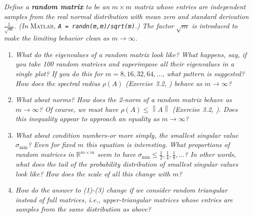 \documentclass[a4paper,oneside]{book}
\numberwithin{equation}{chapter}
\begin{document}
\textit{Define a \textbf{random matrix} to be an $m\times m$ matrix whose entries are independent samples from the real normal distribution with mean zero and standard derivation $\frac{1}{{\sqrt m }}$. (In}\textsc{ Matlab}\textit{, \texttt{A = randn(m,m)/sqrt(m)}.) The factor $\sqrt m$ is introduced to make the limiting behavior clean as $m\to \infty$.}
\begin{enumerate}
\item \textit{What do the eigenvalues of a random matrix look like? What happens, say, if you take 100 random matrices and superimpose all their eigenvalues in a single plot? If you do this for $m=8,16,32,64,\ldots$, what pattern is suggested? How does the spectral radius $\rho \left(A\right)$ (Exercise 3.2, \cite{1}) behave as $m\to \infty$?}
\item \textit{What about norms? How does the 2-norm of a random matrix behave as $m\to \infty$? Of course, we must have $\rho \left( A \right) \le \left\| A \right\|$ (Exercise 3.2, \cite{1}). Does this inequality appear to approach an equality as $m\to \infty$?}
\item \textit{What about condition numbers-or more simply, the smallest singular value $\sigma _{\min}$? Even for fixed $m$ this equation is interesting. What proportions of random matrices in $\mathbb{R}^{m\times
 m}$ seem to have ${\sigma _{\min }} \le \frac{1}{2},\frac{1}{4},\frac{1}{8}, \ldots $? In other words, what does the tail of the probability distribution of smallest singular values look like? How does the scale of all this change with $m$?}
\item \textit{How do the answer to (1)-(3) change if we consider random triangular instead of full matrices, i.e., upper-triangular matrices whose entries are samples from the same  distribution as above?}
\end{enumerate}
\end{document}
